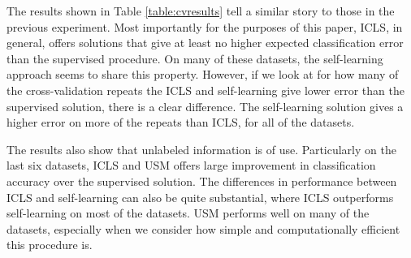 \documentclass[twoside]{memoir}\usepackage[]{graphicx}\usepackage{xcolor}
\begin{document}
The results shown in Table \ref{table:cvresults} tell a similar story to those in the previous experiment. Most importantly for the purposes of this paper, ICLS, in general, offers solutions that give at least no higher expected classification error than the supervised procedure. 
On many of these datasets, the self-learning approach seems to share this property. However, if we look at for how many of the cross-validation repeats the ICLS and self-learning give lower error than the supervised solution, there is a clear difference. The self-learning solution gives a higher error on more of the repeats than ICLS, for all of the datasets.

The results also show that unlabeled information is of use. Particularly on the last six datasets, ICLS and USM offers large improvement in classification accuracy over the supervised solution. The differences in performance between ICLS and self-learning can also be quite substantial, where ICLS outperforms self-learning on most of the datasets.
USM performs well on many of the datasets, especially when we consider how simple and computationally efficient this procedure is. 
\end{document}
